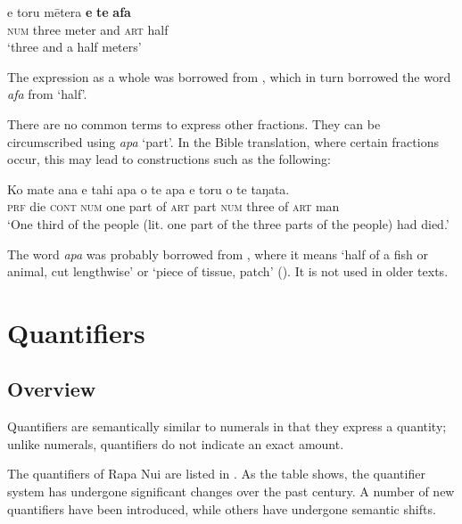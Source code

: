 \ea\label{ex:4.47}
\gll e toru mētera \textbf{{\ꞌ}e} \textbf{te} \textbf{{\ꞌ}afa} \\
\textsc{num} three meter and \textsc{art} half \\

\glt
‘three and a half meters’ \textstyleExampleref{[Notes]}
\z

The expression as a whole was borrowed from , which in turn borrowed the word \textit{{\ꞌ}afa} from  ‘half’.

There are no common terms to express other fractions. They can be circumscribed using \textit{{\ꞌ}apa} ‘part’. In the Bible translation, where certain fractions occur, this may lead to constructions such as the following:

\ea\label{ex:4.48}
\gll Ko mate {\ꞌ}ana e tahi {\ꞌ}apa o te {\ꞌ}apa e toru o te taŋata. \\
\textsc{prf} die \textsc{cont} \textsc{num} one part of \textsc{art} part \textsc{num} three of \textsc{art} man \\

\glt
‘One third of the people (lit. one part of the three parts of the people) had died.’ \textstyleExampleref{[Rev. 9:20]}
\z

The word \textit{{\ꞌ}apa} was probably borrowed from , where it means ‘half of a fish or animal, cut lengthwise’ or ‘piece of tissue, patch’ (\citealt[49]{AcadémieTahitienne1999}). It is not used in older texts.

\section{Quantifiers}\label{sec:4.4}
\subsection{Overview}\label{sec:4.4.1}

Quantifiers are semantically similar to numerals in that they express a quantity; unlike numerals, quantifiers do not indicate an exact amount. 

The quantifiers of Rapa Nui are listed in . As the table shows, the quantifier system has undergone significant changes over the past century. A number of new quantifiers have been introduced, while others have undergone semantic shifts. 

